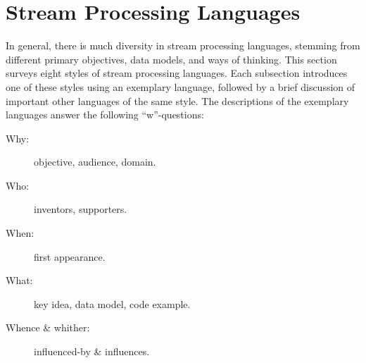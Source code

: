 \section{Stream Processing Languages}\label{sec:languages}

In general, there is much diversity in stream processing languages,
stemming from different primary objectives, data models, and ways of
thinking. This section surveys eight styles of stream processing languages.  Each
subsection introduces one of these styles using an exemplary language, followed by a
brief discussion of important other languages of the same style. The
descriptions of the exemplary languages answer the following
``w''-questions:

\begin{description}
  \item[Why:] objective, audience, domain.
  \item[Who:] inventors, supporters.
  \item[When:] first appearance.
  \item[What:] key idea, data model, code example.
  \item[Whence \& whither:] influenced-by \& influences.
\end{description}










